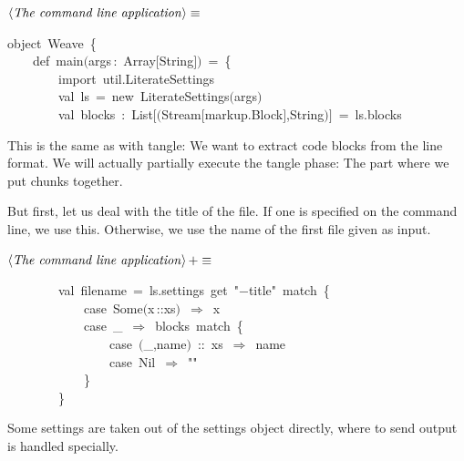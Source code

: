 \documentclass[a4paper,12pt]{article}
\begin{document}
$\left<\mbox{\emph{The command line application}}\right>\equiv$
\begin{program}{\vem object}~Weave~{\small\{}
\\~~~~{\vem def}~main$($args\,{\rm :}~Array$[$String$]$$)$~=~{\small\{}
\\~~~~~~~~{\vem import}~util.LiterateSettings
\\[0.5em]~~~~~~~~{\vem val}~ls~=~{\vem new}~LiterateSettings$($args$)$
\\[0.5em]~~~~~~~~{\vem val}~blocks~{\rm :}~List$[$$($Stream$[$markup.Block$]$,String$)$$]$~=~ls.blocks
\\[0.5em]\end{program}
This is the same as with tangle: We want to extract
code blocks from the line format. We will actually
partially execute the tangle phase: The part where we
put chunks together.

But first, let us deal with the title of the file. If one is specified
on the command line, we use this. Otherwise, we use the name of the first
file given as input.

$\left<\mbox{\emph{The command line application}}\right>+\equiv$
\begin{program}~~~~~~~~{\vem val}~filename~=~ls.settings~get~"$-$title"~{\vem match}~{\small\{}
\\~~~~~~~~~~~~{\vem case}~Some$($x\,{\rm :}{\rm :}xs$)$~$\Rightarrow$~x
\\~~~~~~~~~~~~{\vem case}~\_~$\Rightarrow$~blocks~{\vem match}~{\small\{}
\\~~~~~~~~~~~~~~~~{\vem case}~$($\_,name$)$~{\rm :}{\rm :}~xs~$\Rightarrow$~name
\\~~~~~~~~~~~~~~~~{\vem case}~Nil~$\Rightarrow$~""
\\~~~~~~~~~~~~{\small\}}
\\~~~~~~~~{\small\}}
\\[0.5em]\end{program}
Some settings are taken out of the settings object directly,
where to send output is handled specially.
\end{document}
